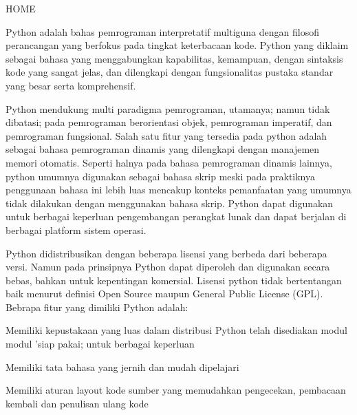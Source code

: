 
\sloppy
{\fontsize{14pt}{14pt}\selectfont HOME \\} \par
\noindent 
{\fontsize{14pt}{14pt}\selectfont Python adalah bahas pemrograman interpretatif multiguna dengan filosofi perancangan yang berfokus pada tingkat keterbacaan kode. Python yang diklaim sebagai bahasa yang menggabungkan kapabilitas, kemampuan, dengan sintaksis kode yang sangat jelas, dan dilengkapi dengan fungsionalitas pustaka standar yang besar serta komprehensif. \\} \par
\noindent 
{\fontsize{14pt}{14pt}\selectfont \vspace{\baselineskip}
Python mendukung multi paradigma pemrograman, utamanya; namun tidak dibatasi; pada pemrograman berorientasi objek, pemrograman imperatif, dan pemrograman fungsional. Salah satu fitur yang tersedia pada python adalah sebagai bahasa pemrograman dinamis yang dilengkapi dengan manajemen memori otomatis. Seperti halnya pada bahasa pemrograman dinamis lainnya, python umumnya digunakan sebagai bahasa skrip meski pada praktiknya penggunaan bahasa ini lebih luas mencakup konteks pemanfaatan yang umumnya tidak dilakukan dengan menggunakan bahasa skrip. Python dapat digunakan untuk berbagai keperluan pengembangan perangkat lunak dan dapat berjalan di berbagai platform sistem operasi. \\} \par
\noindent 
{\fontsize{14pt}{14pt}\selectfont Python didistribusikan dengan beberapa lisensi yang berbeda dari beberapa versi. Namun pada prinsipnya Python dapat diperoleh dan digunakan secara bebas, bahkan untuk kepentingan komersial. Lisensi python tidak bertentangan baik menurut definisi Open Source maupun General Public License (GPL).\vspace{\baselineskip}
Bebrapa fitur yang dimiliki Python adalah: \\} \par
\noindent 
{\fontsize{14pt}{14pt}\selectfont Memiliki kepustakaan yang luas dalam distribusi Python telah disediakan modul modul 'siap pakai; untuk berbagai keperluan \\} \par
\noindent 
{\fontsize{14pt}{14pt}\selectfont Memiliki tata bahasa yang jernih dan mudah dipelajari \\} \par
\noindent 
{\fontsize{14pt}{14pt}\selectfont Memiliki aturan layout kode sumber yang memudahkan pengecekan, pembacaan kembali dan penulisan ulang kode \\} \par
